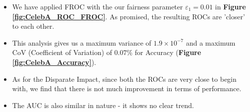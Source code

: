 \documentclass{article}
\begin{document}
        
        



\begin{itemize}
    \item We have applied FROC with the our fairness parameter $\varepsilon_1 = 0.01$ in \textbf{Figure \ref{fig:CelebA_ROC_FROC}}. As promised, the resulting ROCs are 'closer' to each other.
    \item This analysis gives us a maximum variance of $1.9\times10^{-7}$ and a maximum CoV (Coefficient of Variation) of $0.07\%$ for Accuracy (\textbf{Figure \ref{fig:CelebA_Accuracy}}).
    \item As for the Disparate Impact, since both the ROCs are very close to begin with, we find that there is not much improvement in terms of performance.
    \item The AUC is also similar in nature - it shows no clear trend.
\end{itemize}
\end{document}
